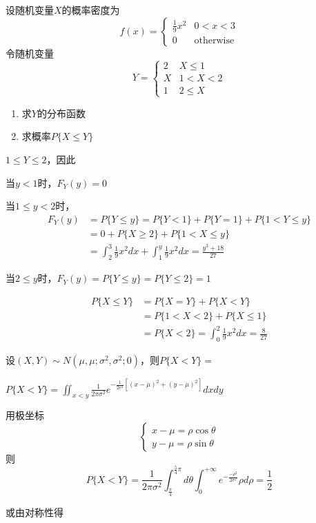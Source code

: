 \documentclass{article}
\begin{document}
\begin{examplle}[]
设随机变量\(X\)的概率密度为
\begin{equation*}
f(x)=
\begin{cases}
\frac{1}{9}x^2&0<x<3\\
0&\text{otherwise}
\end{cases}
\end{equation*}
令随机变量
\begin{equation*}
Y=
\begin{cases}
2&X\le1\\
X&1<X<2\\
1&2\le X
\end{cases}
\end{equation*}
\begin{enumerate}
\item 求\(Y\)的分布函数
\item 求概率\(P\{X\le Y\}\)
\end{enumerate}



\(1\le Y\le2\)，因此

当\(y<1\)时，\(F_Y(y)=0\)

当\(1\le y<2\)时，
\begin{align*}
F_Y(y)&=P\{Y\le y\}=P\{Y<1\}+P\{Y=1\}+P\{1<Y\le y\}\\
&=0+P\{X\ge2\}+P\{1<X\le y\}\\
&=\int_2^3\frac{1}{9}x^2dx+\int_1^y\frac{1}{9}x^2dx=\frac{y^3+18}{27}
\end{align*}

当\(2\le y\)时，\(F_Y(y)=P\{Y\le y\}=P\{Y\le 2\}=1\)

\begin{align*}
P\{X\le Y\}&=P\{X=Y\}+P\{X<Y\}\\
&=P\{1<X<2\}+P\{X\le1\}\\
&=P\{X<2\}=\int_0^2\frac{1}{9}x^2dx=\frac{8}{27}
\end{align*}
\end{examplle}

\begin{examplle}[]
设\((X,Y)\sim N(\mu,\mu;\sigma^2,\sigma^2;0)\)，则\(P\{X<Y\}=\)

\(P\{X<Y\}=\displaystyle\iint_{x<y}\frac{1}{2\pi\sigma^2}e^
   {-\frac{1}{2e^2}[(x-\mu)^2+(y-\mu)^2]}dxdy\)

用极坐标
\begin{equation*}
\begin{cases}
x-\mu=\rho\cos\theta\\
y-\mu=\rho\sin\theta
\end{cases}
\end{equation*}
则
\begin{equation*}
P\{X<Y\}=\frac{1}{2\pi\sigma^2}\int_{\frac{\pi}{4}}^{\frac{5}{4}\pi}d\theta
\int_0^{+\infty}e^{-\frac{-\rho^2}{2\sigma^2}}\rho d\rho=\frac{1}{2}
\end{equation*}

或由对称性得
\end{examplle}
\end{document}
